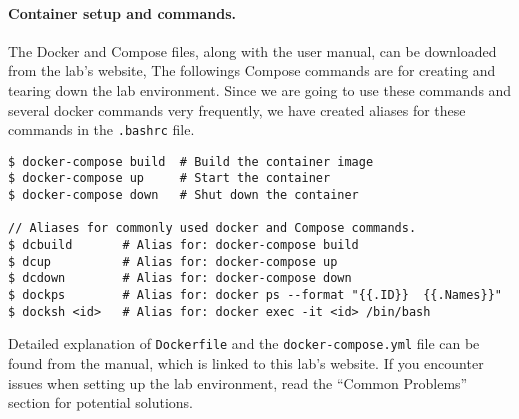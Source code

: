 
\paragraph{Container setup and commands.}



The Docker and Compose files, along with the user manual,
can be downloaded from the lab's website,
The followings Compose commands are for creating and tearing down
the lab environment. 
Since we are going to use 
these commands and several docker commands very
frequently, we have created aliases for these commands
in the \texttt{.bashrc} file.  


\begin{lstlisting}
$ docker-compose build  # Build the container image
$ docker-compose up     # Start the container
$ docker-compose down   # Shut down the container

// Aliases for commonly used docker and Compose commands. 
$ dcbuild       # Alias for: docker-compose build
$ dcup          # Alias for: docker-compose up
$ dcdown        # Alias for: docker-compose down
$ dockps        # Alias for: docker ps --format "{{.ID}}  {{.Names}}" 
$ docksh <id>   # Alias for: docker exec -it <id> /bin/bash
\end{lstlisting}



Detailed explanation of \texttt{Dockerfile} and
the \texttt{docker-compose.yml} file can be found from
the manual, which is linked to this lab's website. If you encounter
issues when setting up the lab environment, read the
``Common Problems'' section for potential solutions.

